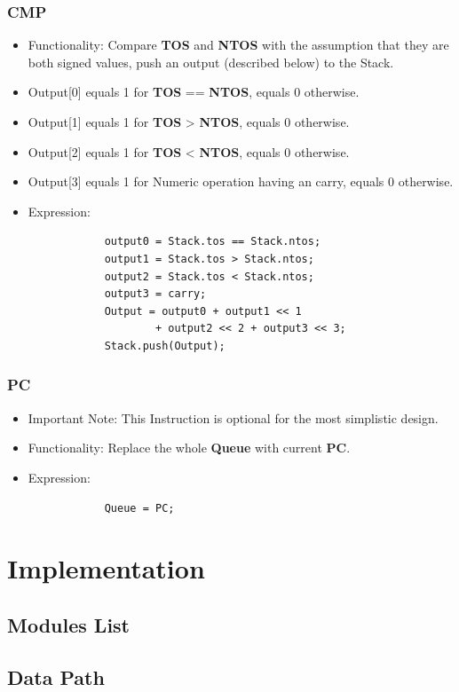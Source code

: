 \documentclass[11pt]{report}
\begin{document}
    \subsection{CMP}
    \begin{itemize}
        \item Functionality: Compare \textbf{TOS} and \textbf{NTOS} with the assumption 
                that they are both signed values, push an output (described below) to the Stack.
        \item Output[0] equals 1 for \textbf{TOS} == \textbf{NTOS}, equals 0 otherwise.
        \item Output[1] equals 1 for \textbf{TOS} > \textbf{NTOS}, equals 0 otherwise.
        \item Output[2] equals 1 for \textbf{TOS} < \textbf{NTOS}, equals 0 otherwise.
        \item Output[3] equals 1 for Numeric operation having an carry, equals 0 otherwise.
        \item Expression:
        \begin{verbatim}
            output0 = Stack.tos == Stack.ntos;
            output1 = Stack.tos > Stack.ntos;
            output2 = Stack.tos < Stack.ntos;
            output3 = carry;
            Output = output0 + output1 << 1 
                    + output2 << 2 + output3 << 3;
            Stack.push(Output);
        \end{verbatim}
    \end{itemize}

    \subsection{PC}
    \begin{itemize}
        \item Important Note: This Instruction is optional for the most simplistic design.
        \item Functionality: Replace the whole \textbf{Queue} with current \textbf{PC}.
        \item Expression:
        \begin{verbatim}
            Queue = PC;
        \end{verbatim}
    \end{itemize}


    \chapter{Implementation}
    \label{chapter:implementation}
    \section{Modules List}
    \section{Data Path}
\end{document}
